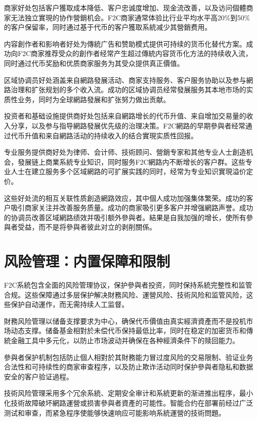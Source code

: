 \documentclass[
  Letterpaper,
]{scrbook}
\begin{document}
商家好处包括客户獲取成本降低、客户忠诚度增加、现金流改善，以及访问個體商家无法独立實現的协作營銷机会。F2C商家通常体验比行业平均水平高20\%到50\%的客户保留率，同时通过基于代币的客户獲取系統减少其營銷费用。

内容創作者和影响者好处为傳統广告和赞助模式提供可持续的货币化替代方案。成功向F2C商家推荐受众的創作者经常产生超过傳統内容货币化方法的持续收入流，同时通过代币奖励和优质商家服务为其受众提供真正價值。

区域协调员好处涵盖来自網路發展活动、商家支持服务、客户服务协助以及参与網路治理和扩张规划的多个收入流。成功的区域协调员经常發展服务其本地市场的实质性业务，同时为全球網路發展和扩张努力做出贡献。

投资者和基础设施提供商好处包括来自網路增长的代币升值、来自增加交易量的收入分享，以及参与指导網路發展优先级的治理决策。F2C網路的早期參與者经常通过代币升值和来自網路活动的持续收入的结合實現实质性回报。

专业服务提供商好处为律师、会计师、技術顾问、營銷专家和其他专业人士創造机会，發展链上商業系統专业知识，同时服务F2C網路内不断增长的客户群。这些专业人士在建立服务多个区域網路的可扩展实践的同时，经常为专业知识實現溢价定价。

这些好处流的相互关联性质創造網路效应，其中個人成功加强集体繁荣。成功的客户吸引商家关注并改善服务质量。成功的商家吸引更多客户并增强網路声誉。成功的协调员改善区域網路绩效并吸引额外參與者。結果是自我加强的增长，使所有參與者受益，而不是将參與者彼此对立的剥削關係。

\section{风险管理：内置保障和限制}\label{ux98ceux9669ux7ba1ux7406ux5185ux7f6eux4fddux969cux548cux9650ux5236}

F2C系統包含全面的风险管理协议，保护參與者投资，同时保持系統完整性和监管合规。这些保障通过多层保护解决財務风险、運營风险、技術风险和监管风险，这些保护自动運作，而无需持续人工监督。

財務风险管理以储备支撑要求为中心，确保代币價值由真实經濟資產而不是投机市场动态支撑。储备基金相對於未偿代币保持最低比率，同时在稳定的加密货币和傳統金融工具中多元化，以防止市场波动并确保在各种經濟条件下的赎回能力。

參與者保护机制包括防止個人相對於其財務能力冒过度风险的交易限制、验证业务合法性和可持续性的商家审查程序，以及防止欺诈活动同时保护參與者隐私和数据安全的客户验证過程。

技術风险管理采用多个冗余系統、定期安全审计和系統更新的渐进推出程序，最小化技術故障破坏網路運營或损害參與者資產的可能性。智能合约在部署前经过广泛测试和审查，而紧急程序使能够快速响应可能影响系統運營的技術問題。
\end{document}
